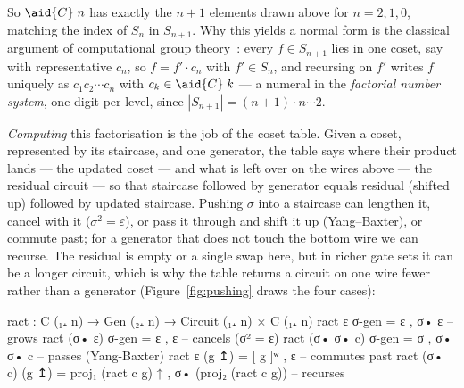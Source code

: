 \noindent So $\aid{C}\;n$ has exactly the $n{+}1$ elements drawn above
for $n = 2, 1, 0$, matching the index of $S_n$ in $S_{n+1}$.  Why this yields
a normal form is the classical argument of computational group
theory~\cite{sims1994computation,holt2005handbook}:
every $f \in S_{n+1}$ lies in one coset, say with representative $c_n$,
so $f = f' \cdot c_n$ with $f' \in S_n$, and recursing on $f'$ writes $f$
uniquely as $c_1 c_2 \cdots c_n$ with $c_k \in \aid{C}\;k$ --- a numeral
in the \emph{factorial number system}, one digit per level, since
$|S_{n+1}| = (n{+}1) \cdot n \cdots 2$.

\emph{Computing} this factorisation is the job of the coset table.
Given a coset, represented by its staircase, and one generator, the
table says where their product lands --- the updated coset --- and what
is left over on the wires above --- the residual circuit --- so that
staircase followed by generator equals residual (shifted up) followed by
updated staircase.
Pushing $\sigma$ into a staircase can lengthen it, cancel with it ($\sigma^2 =
\varepsilon$), or pass it through and shift it up (Yang--Baxter), or
commute past; for a generator that does not touch the bottom wire we can
recurse.  The residual is empty or a single swap here, but in richer
gate sets it can be a longer circuit, which is why the table returns a
circuit on one wire fewer rather than a generator
(Figure~\ref{fig:pushing} draws the four cases):

\begin{center}
\begin{minipage}[c]{0.65\linewidth}
\begingroup\setlength{\mathindent}{0pt}
\begin{code}
ract : C (₁₊ n) → Gen (₂₊ n) → Circuit (₁₊ n) × C (₁₊ n)
ract ε σ-gen = ε , σ• ε             -- grows
ract (σ• ε) σ-gen = ε , ε           -- cancels (σ² = ε)
ract (σ• σ• c) σ-gen = σ , σ• σ• c  -- passes (Yang-Baxter)
ract ε (g ↥) = [ g ]ʷ , ε           -- commutes past
ract (σ• c) (g ↥) = proj₁ (ract c g) ↑ , σ• (proj₂ (ract c g))  -- recurses
\end{code}
\endgroup
\end{minipage}\hspace{0.5em}%
\begin{minipage}[c]{0.30\linewidth}\raggedright
  \;\scalebox{0.7}{$\approx$}\;
\end{minipage}
\end{center}

